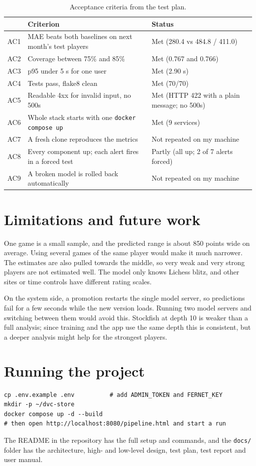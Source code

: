 \documentclass[11pt,a4paper]{article}
\begin{document}
\begin{table}[H]
\centering
\caption{Acceptance criteria from the test plan.}
\begin{tabularx}{\textwidth}{lXl}
\toprule
 & Criterion & Status \\
\midrule
AC1 & MAE beats both baselines on next month's test players & Met (280.4 vs 484.8 / 411.0) \\
AC2 & Coverage between 75\% and 85\% & Met (0.767 and 0.766) \\
AC3 & p95 under 5 s for one user & Met (2.90 s) \\
AC4 & Tests pass, flake8 clean & Met (70/70) \\
AC5 & Readable 4xx for invalid input, no 500s & Met (HTTP 422 with a plain message; no 500s) \\
AC6 & Whole stack starts with one \texttt{docker compose up} & Met (9 services) \\
AC7 & A fresh clone reproduces the metrics & Not repeated on my machine \\
AC8 & Every component up; each alert fires in a forced test & Partly (all up; 2 of 7 alerts forced) \\
AC9 & A broken model is rolled back automatically & Not repeated on my machine \\
\bottomrule
\end{tabularx}
\end{table}

\section{Limitations and future work}

One game is a small sample, and the predicted range is about 850 points wide on average. Using
several games of the same player would make it much narrower. The estimates are also pulled
towards the middle, so very weak and very strong players are not estimated well. The model only
knows Lichess blitz, and other sites or time controls have different rating scales.

On the system side, a promotion restarts the single model server, so predictions fail for a few
seconds while the new version loads. Running two model servers and switching between them would
avoid this. Stockfish at depth 10 is weaker than a full analysis; since training and the app use
the same depth this is consistent, but a deeper analysis might help for the strongest players.

\appendix
\section{Running the project}

\begin{verbatim}
cp .env.example .env          # add ADMIN_TOKEN and FERNET_KEY
mkdir -p ~/dvc-store
docker compose up -d --build
# then open http://localhost:8080/pipeline.html and start a run
\end{verbatim}
The README in the repository has the full setup and commands, and the \texttt{docs/} folder has
the architecture, high- and low-level design, test plan, test report and user manual.
\end{document}
